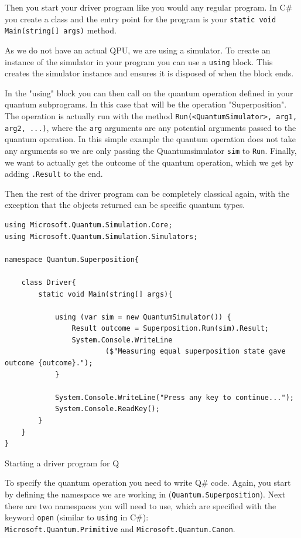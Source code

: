 Then you start your driver program like you would any regular program. In C\# you create a class and the entry point for the program is your \texttt{static void Main(string[] args)} method.

As we do not have an actual QPU, we are using a simulator. To create an instance of the simulator in your program you can use a \texttt{using} block. This creates the simulator instance and ensures it is disposed of when the block ends.

In the "using" block you can then call on the quantum operation defined in your quantum subprograms. In this case that will be the operation "Superposition". The operation is actually run with the method \texttt{Run(<QuantumSimulator>, arg1, arg2, ...)}, where the \texttt{arg} arguments are any potential arguments passed to the quantum operation. In this simple example the quantum operation does not take any arguments so we are only passing the Quantumsimulator \texttt{sim} to \texttt{Run}. Finally, we want to actually get the outcome of the quantum operation, which we get by adding \texttt{.Result} to the end.

Then the rest of the driver program can be completely classical again, with the exception that the objects returned can be specific quantum types.

\begin{listing}[H]
\begin{verbatim}
using Microsoft.Quantum.Simulation.Core;
using Microsoft.Quantum.Simulation.Simulators;

namespace Quantum.Superposition{

    class Driver{
        static void Main(string[] args){

            using (var sim = new QuantumSimulator()) {
                Result outcome = Superposition.Run(sim).Result;
                System.Console.WriteLine
                        ($"Measuring equal superposition state gave outcome {outcome}.");
            }

            System.Console.WriteLine("Press any key to continue...");
            System.Console.ReadKey();
        }
    }
}
\end{verbatim}
\caption{Starting a driver program for Q}
\label{lst:CdriverSimple}
\end{listing}

To specify the quantum operation you need to write Q\# code. Again, you start by defining the namespace we are working in (\texttt{Quantum.Superposition}). Next there are two namespaces you will need to use, which are specified with the keyword \texttt{open} (similar to \texttt{using} in C\#): \\ \texttt{Microsoft.Quantum.Primitive} and \texttt{Microsoft.Quantum.Canon}.

